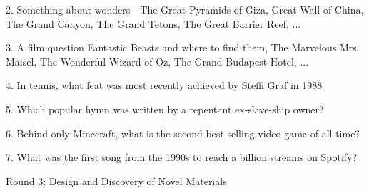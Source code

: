 \begin{frame}
\begin{center}
\Large
2. Something about wonders - The Great Pyramids of Giza, Great Wall of China, The Grand Canyon, The Grand Tetons, The Great Barrier Reef, ...
\\
\end{center}
\end{frame}
\begin{frame}
\begin{center}
\Large
3. A film question Fantastic Beasts and where to find them, The Marvelous Mrs. Maisel, The Wonderful Wizard of Oz, The Grand Budapest Hotel, ...
\\
\end{center}
\end{frame}
\begin{frame}
\begin{center}
\Large
4. In tennis, what feat was most recently achieved by Steffi Graf in 1988
\\
\end{center}
\end{frame}
\begin{frame}
\begin{center}
\Large
5. Which popular hymn was written by a repentant ex-slave-ship owner?
\\
\end{center}
\end{frame}
\begin{frame}
\begin{center}
\Large
6. Behind only Minecraft, what is the second-best selling video game of all time?
\\
\end{center}
\end{frame}
\begin{frame}
\begin{center}
\Large
7. What was the first song from the 1990s to reach a billion streams on Spotify?
\\
\end{center}
\end{frame}
\begin{frame}
\begin{center}
\Huge
Round 3: Design and Discovery of Novel Materials
\end{center}
\end{frame}

